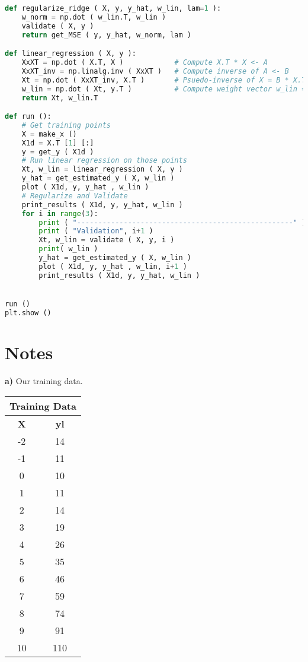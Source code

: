 \documentclass{article}
\begin{document}
\begin{lstlisting}[language=Python,breaklines=true]
def regularize_ridge ( X, y, y_hat, w_lin, lam=1 ):
    w_norm = np.dot ( w_lin.T, w_lin )
    validate ( X, y )
    return get_MSE ( y, y_hat, w_norm, lam )

def linear_regression ( X, y ):
    XxXT = np.dot ( X.T, X )            # Compute X.T * X <- A
    XxXT_inv = np.linalg.inv ( XxXT )   # Compute inverse of A <- B
    Xt = np.dot ( XxXT_inv, X.T )       # Psuedo-inverse of X = B * X.T <- C
    w_lin = np.dot ( Xt, y.T )          # Compute weight vector w_lin = C * y
    return Xt, w_lin.T

def run ():
    # Get training points
    X = make_x ()
    X1d = X.T [1] [:]
    y = get_y ( X1d )
    # Run linear regression on those points
    Xt, w_lin = linear_regression ( X, y )
    y_hat = get_estimated_y ( X, w_lin )
    plot ( X1d, y, y_hat , w_lin )
    # Regularize and Validate
    print_results ( X1d, y, y_hat, w_lin )
    for i in range(3):
        print ( "---------------------------------------------------" )
        print ( "Validation", i+1 )
        Xt, w_lin = validate ( X, y, i )
        print( w_lin )
        y_hat = get_estimated_y ( X, w_lin )
        plot ( X1d, y, y_hat , w_lin, i+1 )
        print_results ( X1d, y, y_hat, w_lin )


run ()
plt.show ()


\end{lstlisting}
\newpage
\section*{Notes}

\hspace{1em} \textbf{a)} Our training data.

\begin{center}
\begin{tabular}{|c|c|}
	\hline
	\multicolumn{2}{|c|}{\textbf{Training Data}} \\\hline
	\textbf{X} & \textbf{yl} \\\hline
	-2 & 14 \\
	-1 & 11\\
	0 & 10\\
	1 & 11 \\
	2 & 14\\
	3 & 19 \\
	4 & 26\\
	5 & 35\\
	6 & 46\\
	7 & 59\\
	8 & 74\\
	9 & 91\\
	10 & 110\\
	\hline
\end{tabular}
\end{center}
\end{document}
